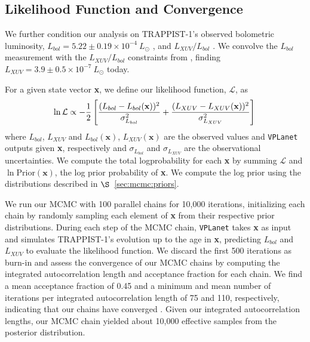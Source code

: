 \documentclass[twocolumn]{aastex62}
\newcommand{\vplanet}[0]{\texttt{VPLanet}\xspace}
\begin{document}
\subsection{Likelihood Function and Convergence} \label{sec:mcmc:like}

We further condition our analysis on TRAPPIST-1's observed bolometric luminosity, $L_{bol} = 5.22 \pm{0.19} \times 10^{-4} \ L_{\odot}$ \citep{vanGrootel2018}, and $L_{XUV}/L_{bol}$ \citep{Wheatley2017}. We convolve the \citet{vanGrootel2018} $L_{bol}$ measurement with the $L_{XUV}/L_{bol}$ constraints from \citet{Wheatley2017}, finding $L_{XUV} = 3.9 \pm{0.5} \times 10^{-7} \ L_{\odot}$ today.

For a given state vector \textbf{x}, we define our likelihood function, $\mathcal{L}$, as
\small
\begin{equation} \label{eqn:lnlike}
    \ln \mathcal{L} \propto -\frac{1}{2} \left[ \frac{(L_{bol} - L_{bol}(\textbf{x}))^2}{\sigma_{L_{bol}}^2} + \frac{(L_{XUV} - L_{XUV}(\textbf{x}))^2}{\sigma_{L_{XUV}}^2} \right] \\
\end{equation}
\normalsize
where $L_{bol}$, $L_{XUV}$ and $L_{bol}(\textbf{x})$, $L_{XUV}(\textbf{x})$ are the observed values and \vplanet outputs given \textbf{x}, respectively and $\sigma_{L_{bol}}$ and $\sigma_{L_{XUV}}$ are the observational uncertainties. We compute the total logprobability for each \textbf{x} by summing $\mathcal{L}$ and $\ln \mathrm{Prior}(\textbf{x})$, the log prior probability of \textbf{x}. We compute the log prior using the distributions described in $\S$~\ref{sec:mcmc:priors}. 

We run our MCMC with 100 parallel chains for 10,000 iterations, initializing each chain by randomly sampling each element of \textbf{x} from their respective prior distributions. During each step of the MCMC chain, \vplanet takes \textbf{x} as input and simulates TRAPPIST-1's evolution up to the age in \textbf{x}, predicting $L_{bol}$ and $L_{XUV}$ to evaluate the likelihood function. We discard the first 500 iterations as burn-in and assess the convergence of our MCMC chains by computing the integrated autocorrelation length and acceptance fraction for each chain. We find a mean acceptance fraction of 0.45 and a minimum and mean number of iterations per integrated autocorrelation length of 75 and 110, respectively, indicating that our chains have converged \citep{ForemanMackey2013}. Given our integrated autocorrelation lengths, our MCMC chain yielded about 10,000 effective samples from the posterior distribution.
\end{document}
